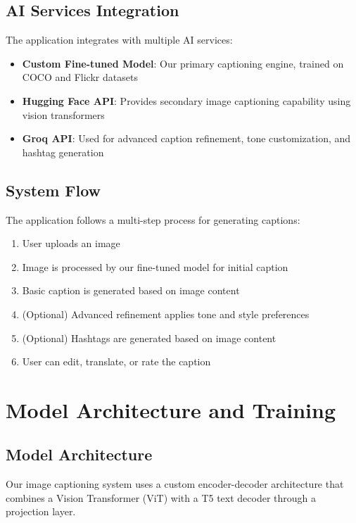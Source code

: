 \documentclass[12pt,a4paper]{report}
\begin{document}
\section{AI Services Integration}
The application integrates with multiple AI services:
\begin{itemize}
    \item \textbf{Custom Fine-tuned Model}: Our primary captioning engine, trained on COCO and Flickr datasets
    \item \textbf{Hugging Face API}: Provides secondary image captioning capability using vision transformers
    \item \textbf{Groq API}: Used for advanced caption refinement, tone customization, and hashtag generation
\end{itemize}

\section{System Flow}
The application follows a multi-step process for generating captions:
\begin{enumerate}
    \item User uploads an image
    \item Image is processed by our fine-tuned model for initial caption
    \item Basic caption is generated based on image content
    \item (Optional) Advanced refinement applies tone and style preferences
    \item (Optional) Hashtags are generated based on image content
    \item User can edit, translate, or rate the caption
\end{enumerate}

\chapter{Model Architecture and Training}
\section{Model Architecture}
Our image captioning system uses a custom encoder-decoder architecture that combines a Vision Transformer (ViT) with a T5 text decoder through a projection layer.
\end{document}
